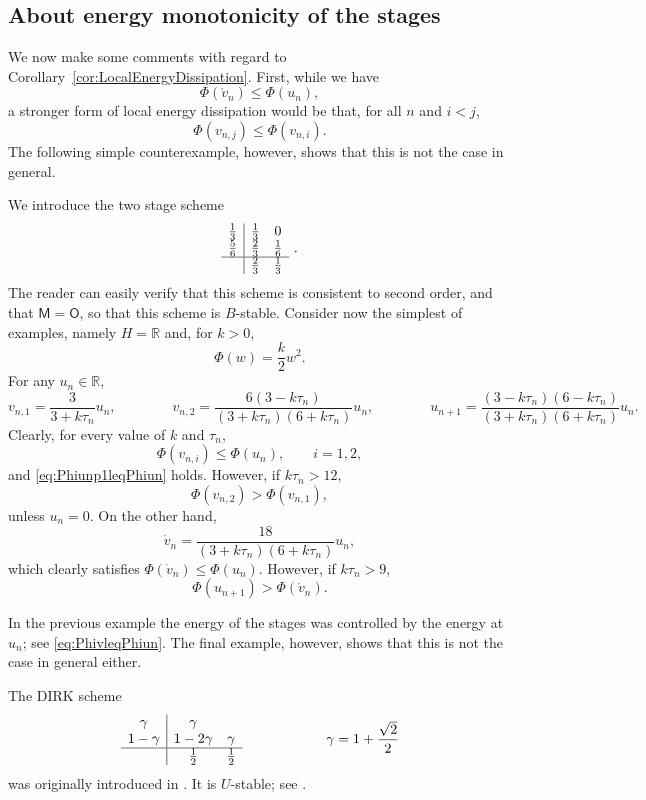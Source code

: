 \documentclass{amsart}
\newcommand{\Real}{\mathbb{R}}
\newcommand{\msfM}{\mathsf{M}}
\newcommand{\msfO}{\mathsf{O}}
\theoremstyle{definition}
\begin{document}
\subsection{About energy monotonicity of the stages}

We now make some comments with regard to Corollary~\ref{cor:LocalEnergyDissipation}. First, while we have
\[
  \Phi(\mathring{v}_n) \leq \Phi(u_n),
\]
a stronger form of local energy dissipation would be that, for all $n$ and $i<j$,
\[
  \Phi(v_{n,j}) \leq \Phi( v_{n,i} ).
\]
The following simple counterexample, however, shows that this is not the case in general.

We introduce the two stage scheme
\[
  \begin{array}{c|cc}
    \frac13 & \frac13 & 0
    \\
    \frac56 & \frac23 & \frac16
    \\
    \hline
           & \frac23 & \frac13
  \end{array} \ .
\]
The reader can easily verify that this scheme is consistent to second order, and that $\msfM = \msfO$, so that this scheme is $B$-stable. Consider now the simplest of examples, namely $H = \Real$ and, for $k>0$,
\begin{equation}
\label{eq:SimplestEnergy}
  \Phi(w) = \frac{k}2 w^2.
\end{equation}
For any $u_n \in \Real$,
\[
  v_{n,1} = \frac{3}{3+k\tau_n} u_n,
  \qquad\qquad
  v_{n,2} = \frac{6(3-k\tau_n)}{(3+k\tau_n)(6+k\tau_n)} u_n,
  \qquad\qquad
  u_{n+1} = \frac{(3-k\tau_n)(6-k\tau_n)}{(3+k\tau_n)(6+k\tau_n)} u_n.
\]
Clearly, for every value of $k$ and $\tau_n$,
\begin{equation}
\label{eq:PhivleqPhiun}
  \Phi( v_{n,i} ) \leq \Phi(u_n), \qquad i = 1,2,
\end{equation}
and \eqref{eq:Phiunp1leqPhiun} holds. However, if $k \tau_n > 12$,
\[
  \Phi(v_{n,2}) > \Phi(v_{n,1}),
\]
unless $u_n = 0$. On the other hand,
\[
  \mathring{v}_n = \frac{18}{(3+k\tau_n)(6+k\tau_n)} u_n,
\]
which clearly satisfies $\Phi(\mathring{v}_n) \leq \Phi(u_n)$. However, if $k \tau_n >9$,
\[
  \Phi(u_{n+1}) > \Phi\left( \mathring{v}_n \right).
\]

In the previous example the energy of the stages was controlled by the energy at $u_n$; see \eqref{eq:PhivleqPhiun}. The final example, however, shows that this is not the case in general either.

The DIRK scheme
\[
  \begin{array}{c|cc}
    \gamma & \gamma \\
    1-\gamma & 1-2\gamma & \gamma
    \\
    \hline
    & \frac12 & \frac12
  \end{array}
  \qquad\qquad\qquad
  \gamma = 1 + \frac{\sqrt{2}}2
\]
was originally introduced in \cite{MR518683}. It is $U$-stable; see \cite[Section 4.2.1]{MR4673496}.
\end{document}
